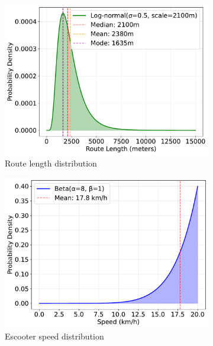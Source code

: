 \begin{figure}
  \begin{subfigure}{0.49\linewidth}
    \centering
    \includegraphics[width=\linewidth]{./fig/route-length-distribution-no-labels.pdf}
    \caption{Route length distribution}
    \label{fig:trip-route-length-distribution}
  \end{subfigure}
  \hfill
  \begin{subfigure}{0.49\linewidth}
    \centering
    \includegraphics[width=\linewidth]{./fig/speed-distribution-no-labels.pdf}
    \caption{Escooter speed distribution}
    \label{fig:trip-speed-distribution}
  \end{subfigure}
  \vfill
  \begin{subfigure}{0.49\linewidth}

\end{subfigure}
\end{figure}
